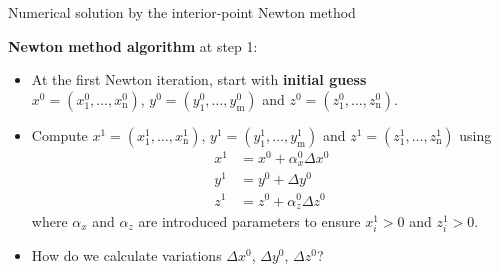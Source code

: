 %
%
\begin{frame}{Numerical solution by the interior-point Newton method}

\alert{\bf Newton method algorithm} at step 1: 
%
\begin{itemize}
\item At the first Newton iteration, start with {\bf initial guess} \\
${x^{0}=(x_{1}^{0},\ldots,x_{\text{n}}^{0})}$,
${y^{0}=(y_{1}^{0},\ldots,y_{\text{m}}^{0})}$ and ${z^{0}=(z_{1}^{0},\ldots,z_{\text{n}}^{0})}$. 
\end{itemize}

\begin{itemize}
\item Compute ${x^{1}=(x_{1}^{1},\ldots,x_{\text{n}}^{1})}$, ${y^{1}=(y_{1}^{1},\ldots,y_{\text{m}}^{1})}$
and ${z^{1}=(z_{1}^{1},\ldots,z_{\text{n}}^{1})}$ using
\begin{align*}
x^{1} & =x^{0}+\alpha_{x}^{0}\Delta x^{0}\\
y^{1} & =y^{0}+\Delta y^{0}\\
z^{1} & =z^{0}+\alpha_{z}^{0}\Delta z^{0}
\end{align*}
where $\alpha_{x}$ and $\alpha_{z}$ are introduced parameters to ensure $x_{i}^{1}>0$ and $z_{i}^{1}>0$. 
\item How do we calculate variations 
$\Delta x^{0}$, $\Delta y^{0}$, $\Delta z^{0}$?
\end{itemize}

\end{frame}
%
